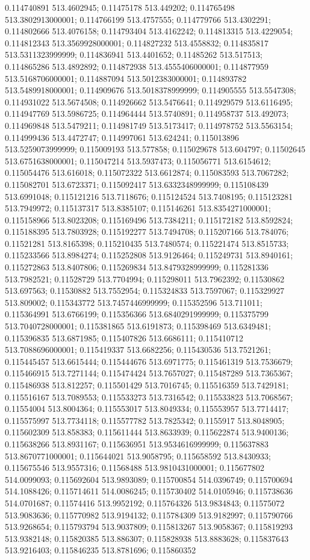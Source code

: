 0.114740891 513.4602945; 0.11475178 513.449202; 0.114765498 513.3802913000001; 0.114766199 513.4757555; 0.114779766 513.4302291; 0.114802666 513.4076158; 0.114793404 513.4162242; 0.114813315 513.4229054; 0.114812343 513.3569928000001; 0.114827232 513.4558832; 0.114835817 513.5311323999999; 0.114836941 513.4401652; 0.11485262 513.517513; 0.114865286 513.4892892; 0.114872938 513.4555406000001; 0.114877959 513.5168706000001; 0.114887094 513.5012383000001; 0.114893782 513.5489918000001; 0.114909676 513.5018378999999; 0.114905555 513.5547308; 0.114931022 513.5674508; 0.114926662 513.5476641; 0.114929579 513.6116495; 0.114947769 513.5986725; 0.114964444 513.5740891; 0.114958737 513.492073; 0.114969848 513.5479211; 0.114981749 513.5173417; 0.114978752 513.5563154; 0.114999436 513.4472747; 0.114997061 513.624241; 0.115013896 513.5259073999999; 0.115009193 513.577858; 0.115029678 513.604797; 0.11502645 513.6751638000001; 0.115047214 513.5937473; 0.115056771 513.6154612; 0.115054476 513.616018; 0.115072322 513.6612874; 0.115083593 513.7067282; 0.115082701 513.6723371; 0.115092417 513.6332348999999; 0.115108439 513.6991048; 0.115121216 513.7118676; 0.115124524 513.7408195; 0.115123281 513.7949972; 0.115137317 513.8385107; 0.115146261 513.8354271000001; 0.115158966 513.8023208; 0.115169496 513.7384211; 0.115172182 513.8592824; 0.115188395 513.7803928; 0.115192277 513.7494708; 0.115207166 513.784076; 0.11521281 513.8165398; 0.115210435 513.7480574; 0.115221474 513.8515733; 0.115233566 513.8984274; 0.115252808 513.9126464; 0.115249731 513.8940161; 0.115272863 513.8407806; 0.115269834 513.8479328999999; 0.115281336 513.7982521; 0.11528729 513.7704994; 0.115298011 513.7962392; 0.11530862 513.697563; 0.11530882 513.7552954; 0.115324833 513.7597067; 0.115329927 513.809002; 0.115343772 513.7457446999999; 0.115352596 513.711011; 0.115364991 513.6766199; 0.115356366 513.6840291999999; 0.115375799 513.7040728000001; 0.115381865 513.6191873; 0.115398469 513.6349481; 0.115396835 513.6871985; 0.115407826 513.6686111; 0.115410712 513.7088696000001; 0.115419337 513.6682256; 0.115430536 513.7521261; 0.115445457 513.6615444; 0.115444676 513.6971775; 0.115461319 513.7536679; 0.115466915 513.7271144; 0.115474424 513.7657027; 0.115487289 513.7365367; 0.115486938 513.812257; 0.115501429 513.7016745; 0.115516359 513.7429181; 0.115516167 513.7089553; 0.115533273 513.7316542; 0.115533823 513.7068567; 0.11554004 513.8004364; 0.115553017 513.8049334; 0.115553957 513.7714417; 0.115575997 513.7734118; 0.115577782 513.7825342; 0.1155917 513.8048905; 0.115602309 513.858383; 0.115611444 513.8633939; 0.115622874 513.9400136; 0.115638266 513.8931167; 0.115636951 513.9534616999999; 0.115637883 513.8670771000001; 0.115644021 513.9058795; 0.115658592 513.8430933; 0.115675546 513.9557316; 0.11568488 513.9810431000001; 0.115677802 514.0099093; 0.115692604 513.9893089; 0.115700854 514.0396749; 0.115700694 514.1088426; 0.115714611 514.0086245; 0.115730402 514.0105946; 0.115738636 514.0701687; 0.11574416 513.9952192; 0.115764326 513.9834843; 0.11575072 513.9083636; 0.115770982 513.9194132; 0.115784309 513.9182997; 0.115790766 513.9268654; 0.115793794 513.9037809; 0.115813267 513.9058367; 0.115819293 513.9382148; 0.115820385 513.886307; 0.115828938 513.8883628; 0.115837643 513.9216403; 0.115846235 513.8781696; 0.115860352 